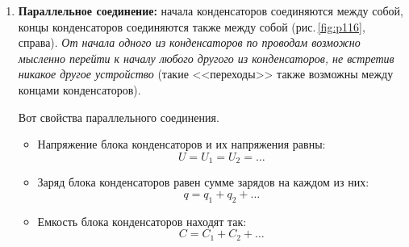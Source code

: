 \documentclass[main.tex]{subfiles}
\begin{document}
\begin{NoHyper}
\begin{enumerate}
    Вот свойства последовательного соединения.
    \begin{itemize}
        \item Заряд блока конденсаторов\footnote{Блок конденсаторов~--- это группа соединенных между собой конденсаторов (блок имеет два вывода, или конца). Такой блок можно рассматривать как один сложный конденсатор.} и заряды конденсаторов равны:
        \begin{equation}
            q=q_1=q_2=\ldots
        \end{equation}
        \item Напряжение между концами блока конденсаторов равно сумме напряжений на каждом конденсаторе:
        \begin{equation}
            U=U_1+U_2+\ldots
        \end{equation}
        \item Емкость блока конденсаторов находят из соотношения: 
        \begin{equation}
            \dfrac{1}{C}=\dfrac{1}{C_1}+\dfrac{1}{C_2}+\ldots
        \end{equation}
    \end{itemize}
    
    
    
    \item \textbf{Параллельное соединение:} начала конденсаторов соединяются между собой, концы конденсаторов соединяются также между собой (рис.\,\ref{fig:p116}, справа). \emph{От начала одного из конденсаторов по проводам возможно мысленно перейти к началу любого другого из конденсаторов, не встретив никакое другое устройство} (такие <<переходы>> также возможны между концами конденсаторов).

    Вот свойства параллельного соединения.
    \begin{itemize}
        \item Напряжение блока конденсаторов и их напряжения равны:
        \begin{equation}
            U=U_1=U_2=\ldots
        \end{equation}
        \item Заряд блока конденсаторов равен сумме зарядов на каждом из них:
        \begin{equation}
            q=q_1+q_2+\ldots
        \end{equation}
        \item Емкость блока конденсаторов находят так: 
        \begin{equation}
            C=C_1+C_2+\ldots
        \end{equation}
    \end{itemize}
    

\end{enumerate}
\end{NoHyper}
\end{document}
